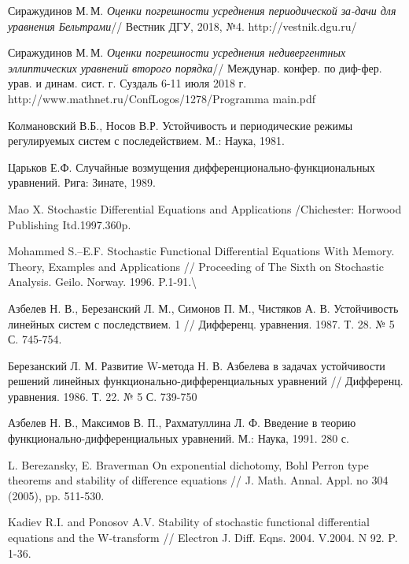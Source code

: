 \begin{thebibliography}{111}
 Сиражудинов М.\,М. \emph{Оценки погрешности усреднения периодической за-дачи для уравнения Бельтрами}// Вестник ДГУ, 2018, №4. http://vestnik.dgu.ru/

	Сиражудинов М.\,М. \emph{Оценки погрешности усреднения недивергентных эллиптических уравнений второго порядка}// Междунар. конфер. по диф-фер. урав. и динам. сист. г. Суздаль 6-11 июля 2018 г. http://www.mathnet.ru/ConfLogos/1278/Programma main.pdf






	Колмановский В.Б., Носов В.Р. Устойчивость и периодические режимы регулируемых систем с последействием. М.: Наука, 1981.
	
	Царьков Е.Ф. Случайные возмущения дифференционально-функциональных уравнений. Рига: Зинате, 1989.
	
	Mao X. Stochastic Differential Equations and Applications /Chichester: Horwood Publishing Itd.1997.360p.
	
	Mohammed S.--E.F. Stochastic Functional Differential Equations With Memory. Theory, Examples and Applications // Proceeding of The Sixth on Stochastic Analysis. Geilo. Norway. 1996. P.1-91.{\textbackslash}
	
	Азбелев Н. В., Березанский Л. М., Симонов П. М., Чистяков А. В. Устойчивость линейных систем с последствием. 1 // Дифференц. уравнения. 1987. Т. 28. № 5 С. 745-754.
	
	Березанский Л. М. Развитие W-метода Н. В. Азбелева в задачах устойчивости решений линейных функционально-дифференциальных уравнений // Дифференц. уравнения. 1986. Т. 22. № 5 С. 739-750
	
	Азбелев Н. В., Максимов В. П., Рахматуллина Л. Ф. Введение в теорию функционально-дифференциальных уравнений. М.: Наука, 1991. 280 с.
	
	L. Berezansky, E. Braverman On exponential dichotomy, Bohl Perron type theorems and stability of difference equations // J. Math. Annal. Appl. no 304 (2005), pp. 511-530.
	
	Kadiev R.I. and Ponosov A.V. Stability of stochastic functional differential equations and the W-transform // Electron J. Diff. Eqns. 2004. V.2004. N 92. P. 1-36.
	

\end{thebibliography}
